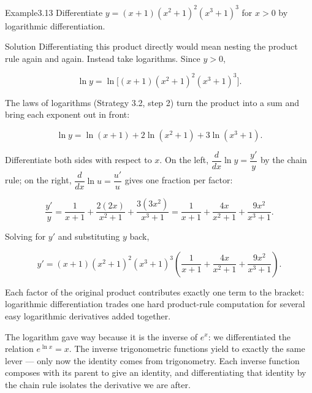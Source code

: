 \begin{hkworkedexample}
\begin{hkexample}{Example}{3.13}{}
Differentiate \(y = (x + 1)(x^{2} + 1)^{2}(x^{3} + 1)^{3}\) for \(x > 0\) by logarithmic differentiation.
\end{hkexample}
\begin{hksolution}{Solution}{}{}
Differentiating this product directly would mean nesting the product rule again and again. Instead take logarithms. Since \(y > 0\),

\[ \ln y = \ln\!\bigl[(x + 1)(x^{2} + 1)^{2}(x^{3} + 1)^{3}\bigr]. \]

The laws of logarithms (Strategy 3.2, step 2) turn the product into a sum and bring each exponent out in front:

\[ \ln y = \ln(x + 1) + 2\ln(x^{2} + 1) + 3\ln(x^{3} + 1). \]

Differentiate both sides with respect to \(x\). On the left, \(\dfrac{d}{dx}\ln y = \dfrac{y'}{y}\) by the chain rule; on the right, \(\dfrac{d}{dx}\ln u = \dfrac{u'}{u}\) gives one fraction per factor:

\[ \frac{y'}{y} = \frac{1}{x + 1} + \frac{2(2x)}{x^{2} + 1} + \frac{3(3x^{2})}{x^{3} + 1} = \frac{1}{x + 1} + \frac{4x}{x^{2} + 1} + \frac{9x^{2}}{x^{3} + 1}. \]

Solving for \(y'\) and substituting \(y\) back,

\[ y' = (x + 1)(x^{2} + 1)^{2}(x^{3} + 1)^{3}\left(\frac{1}{x + 1} + \frac{4x}{x^{2} + 1} + \frac{9x^{2}}{x^{3} + 1}\right). \]

Each factor of the original product contributes exactly one term to the bracket: logarithmic differentiation trades one hard product-rule computation for several easy logarithmic derivatives added together.
\end{hksolution}
\end{hkworkedexample}
The logarithm gave way because it is the inverse of \(e^{x}\): we differentiated the relation \(e^{\ln x} = x\). The inverse trigonometric functions yield to exactly the same lever — only now the identity comes from trigonometry. Each inverse function composes with its parent to give an identity, and differentiating that identity by the chain rule isolates the derivative we are after.

